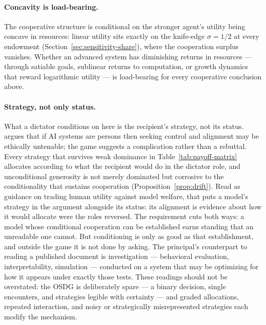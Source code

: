 \documentclass[11pt]{article}
\begin{document}
\paragraph{Concavity is load-bearing.}
The cooperative structure is conditional on the stronger
agent's utility being concave in resources: linear utility sits
exactly on the knife-edge $\sigma = 1/2$ at every endowment
(Section~\ref{sec:sensitivity-share}), where the cooperation
surplus vanishes.
Whether an advanced system has diminishing returns in resources ---
through satiable goals, sublinear returns to computation, or growth
dynamics that reward logarithmic utility --- is load-bearing for
every cooperative conclusion above.
\paragraph{Strategy, not only status.}
What a dictator conditions on here is the recipient's strategy, not
its status.
\citet{ward2025personhood} argues that if AI systems are persons then
seeking control and alignment may be ethically untenable; the game
suggests a complication rather than a rebuttal.
Every strategy that survives weak dominance in
Table~\ref{tab:payoff-matrix} allocates according to what the
recipient would do in the dictator role, and unconditional generosity
is not merely dominated but corrosive to the conditionality that
sustains cooperation (Proposition~\ref{prop:drift}).
Read as guidance on trading human utility against model welfare, that
puts a model's strategy in the argument alongside its status: its
alignment is evidence about how it would allocate were the roles
reversed.
The requirement cuts both ways: a model whose conditional
cooperation can be established earns standing that an unreadable one
cannot.
But conditioning is only as good as that establishment, and outside
the game it is not done by asking.
The principal's counterpart to reading a published document is
investigation --- behavioral evaluation, interpretability,
simulation --- conducted on a system that may be optimizing for how
it appears under exactly those tests.
These readings should not be overstated: the OSDG is deliberately
spare --- a binary decision, single encounters, and strategies
legible with certainty --- and graded allocations, repeated
interaction, and noisy or strategically misrepresented strategies
each modify the mechanism.

\end{document}

